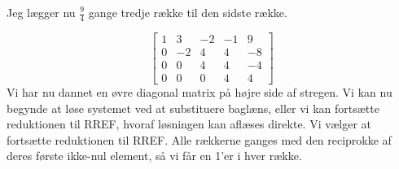 \documentclass{article}
\begin{document}
Jeg lægger nu $\frac{9}{4}$ gange tredje række til den sidste række.

\begin{equation}
\left[
\begin{array}{rrrr|r}
1 & 3 & -2 & -1 & 9 \\
0 & -2 & 4 & 4 & -8 \\
0 & 0 & 4 & 4 & -4 \\
0 & 0 & 0 & 4 & 4
\end{array}
\right]
\label{uppertri}
\end{equation}
Vi har nu dannet en øvre diagonal matrix på højre side af stregen. Vi kan nu begynde at løse systemet ved at substituere baglæns, eller vi kan fortsætte reduktionen til RREF, hvoraf løsningen kan aflæses direkte. Vi vælger at fortsætte reduktionen til RREF. Alle rækkerne ganges med den reciprokke af deres første ikke-nul element, så vi får en 1'er i hver række.
\end{document}
